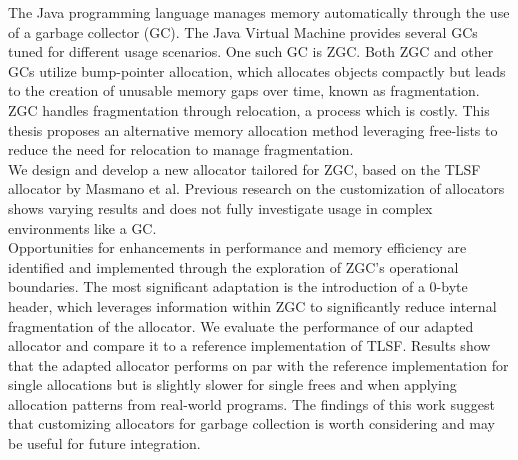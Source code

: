 
The Java programming language manages memory automatically through the use of a garbage collector (GC). The Java Virtual Machine provides several GCs tuned for different usage scenarios. One such GC is ZGC. Both ZGC and other GCs utilize bump-pointer allocation, which allocates objects compactly but leads to the creation of unusable memory gaps over time, known as fragmentation. ZGC handles fragmentation through relocation, a process which is costly. This thesis proposes an alternative memory allocation method leveraging free-lists to reduce the need for relocation to manage fragmentation.\\

We design and develop a new allocator tailored for ZGC, based on the TLSF allocator by Masmano et al. Previous research on the customization of allocators shows varying results and does not fully investigate usage in complex environments like a GC.\\

Opportunities for enhancements in performance and memory efficiency are identified and implemented through the exploration of ZGC's operational boundaries. The most significant adaptation is the introduction of a 0-byte header, which leverages information within ZGC to significantly reduce internal fragmentation of the allocator. We evaluate the performance of our adapted allocator and compare it to a reference implementation of TLSF. Results show that the adapted allocator performs on par with the reference implementation for single allocations but is slightly slower for single frees and when applying allocation patterns from real-world programs. The findings of this work suggest that customizing allocators for garbage collection is worth considering and may be useful for future integration.\\

